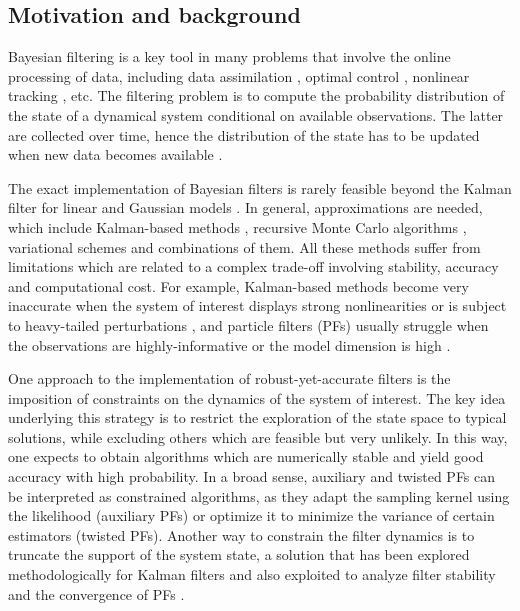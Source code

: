 \documentclass[onefignum,onetabnum]{siamonline250211}%
\begin{document}
%
\subsection{Motivation and background}

Bayesian filtering is a key tool in many problems that involve the online processing of data, including data assimilation \cite{Leeuwen09, Law15, Reich15, Fearnhead18}, optimal control \cite{Bensoussan92,Mitter02,Georgiou13}, nonlinear tracking \cite{Arulampalam02b,Ristic04,Stone13}, etc. The filtering problem is to compute the probability distribution of the state of a dynamical system conditional on available observations. The latter are collected over time, hence the distribution of the state has to be updated when new data becomes available \cite{Anderson79,Bain08}.  

The exact implementation of Bayesian filters is rarely feasible beyond the Kalman filter for linear and Gaussian models \cite{Kalman60,Kalman61,Anderson79,Ristic04}. In general, approximations are needed, which include Kalman-based methods \cite{Anderson79,Evensen03,Julier04}, recursive Monte Carlo algorithms \cite{Gordon93,Doucet00,Evensen03,Djuric03}, variational schemes \cite{Smidl08,Frazier23} and combinations of them. All these methods suffer from limitations which are related to a complex trade-off involving stability, accuracy and computational cost. For example, Kalman-based methods become very inaccurate when the system of interest displays strong nonlinearities or is subject to heavy-tailed perturbations \cite{Ristic04}, and particle filters (PFs) \cite{Gordon93,Kitagawa96,Doucet00,Djuric03} usually struggle when the observations are highly-informative or the model dimension is high \cite{Bengtsson08,Snyder08}.

One approach to the implementation of robust-yet-accurate filters is the imposition of constraints on the dynamics of the system of interest. The key idea underlying this strategy is to restrict the exploration of the state space to typical solutions, while excluding others which are feasible but very unlikely. In this way, one expects to obtain algorithms which are numerically stable and yield good accuracy with high probability. In a broad sense, auxiliary \cite{Pitt01,Douc09b,Branchini21} and twisted \cite{Whiteley14,Ala16} PFs can be interpreted as constrained algorithms, as they adapt the sampling kernel using the likelihood (auxiliary PFs) or optimize it to minimize the variance of certain estimators (twisted PFs). Another way to constrain the filter dynamics is to truncate the support of the system state, a solution that has been explored methodologically for Kalman filters \cite{Garcia12,Amor17} and also exploited to analyze filter stability \cite{Crisan20} and the convergence of PFs \cite{Heine08}.
\end{document}

